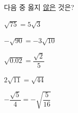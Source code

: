 다음 중 옳지 \underline{않은} 것은?
\begin{choices32}{\rule[-3ex]{0pt}{8ex}$\sqrt{75}=5\sqrt{3}$}{\rule[-3ex]{0pt}{8ex}$-\sqrt{90}=-3\sqrt{10}$}{\rule[-3ex]{0pt}{8ex}$\sqrt{0.02}=\dfrac{\sqrt{2}}{5}$}{\rule[-3ex]{0pt}{8ex}$2\sqrt{11}=\sqrt{44}$}{\rule[-3ex]{0pt}{8ex}$-\dfrac{\sqrt{5}}{4}=-\sqrt{\dfrac{5}{16}}$}\end{choices32}
